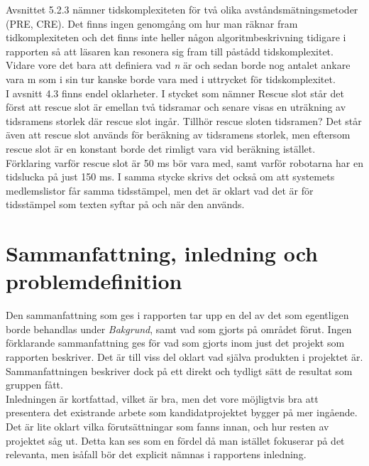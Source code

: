 \documentclass[a4paper,11pt]{article}
\begin{document}
Avsnittet 5.2.3 nämner tidskomplexiteten för två olika avståndsmätningsmetoder (PRE, CRE). Det finns ingen genomgång om hur man räknar fram tidkomplexiteten och det finns inte heller någon algoritmbeskrivning tidigare i rapporten så att läsaren kan resonera sig fram till påstådd tidskomplexitet. Vidare vore det bara att definiera vad \emph{n} är och sedan borde nog antalet ankare vara m som i sin tur kanske borde vara med i uttrycket för tidskomplexitet. \\

I avsnitt 4.3 finns endel oklarheter. I stycket som nämner Rescue slot står det först att rescue slot är emellan två tidsramar och senare visas en uträkning av tidsramens storlek där rescue slot ingår. Tillhör rescue sloten tidsramen? Det står även att rescue slot används för beräkning av tidsramens storlek, men eftersom rescue slot är en konstant borde det rimligt vara vid beräkning istället. Förklaring varför rescue slot är 50 ms bör vara med, samt varför robotarna har en tidslucka på just 150 ms. I samma stycke skrivs det också om att systemets medlemslistor får samma tidsstämpel, men det är oklart vad det är för tidsstämpel som texten syftar på och när den används.

\section{Sammanfattning, inledning och problemdefinition}

Den sammanfattning som ges i rapporten tar upp en del av det som egentligen borde behandlas under \emph{Bakgrund}, samt vad som gjorts på området förut. Ingen förklarande sammanfattning ges för vad som gjorts inom just det projekt som rapporten beskriver. Det är till viss del oklart vad själva produkten i projektet är. Sammanfattningen beskriver dock på ett direkt och tydligt sätt de resultat som gruppen fått. \\

Inledningen är kortfattad, vilket är bra, men det vore möjligtvis bra att presentera det existrande arbete som kandidatprojektet bygger på mer ingående. Det är lite oklart vilka förutsättningar som fanns innan, och hur resten av projektet såg ut. Detta kan ses som en fördel då man istället fokuserar på det relevanta, men isåfall bör det explicit nämnas i rapportens inledning. \\
\end{document}
